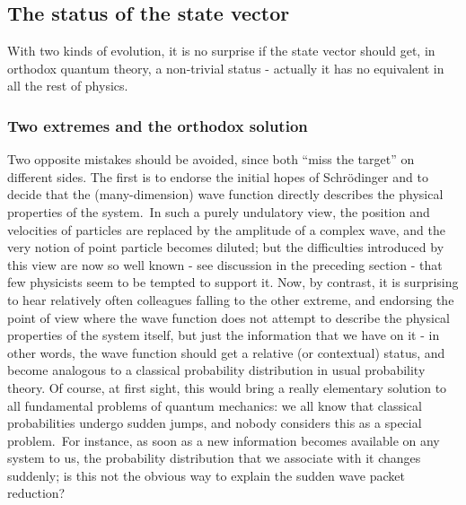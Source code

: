 \documentclass[12pt,onecolumn]{article}%
\begin{document}
\subsection{The status of the state vector}

\label{status}

With two kinds of evolution, it is no surprise if the state vector should get,
in orthodox quantum theory, a non-trivial status - actually it has no
equivalent in all the rest of physics.

\subsubsection{Two extremes and the orthodox solution}

Two opposite mistakes should be avoided, since both ``miss the target'' on
different sides. The first is to endorse the initial hopes of Schr\"{o}dinger
and to decide that the (many-dimension) wave function directly describes the
physical properties of the system.\ In such a purely undulatory view, the
position and velocities of particles are replaced by the amplitude of a
complex wave, and the very notion of point particle becomes diluted; but the
difficulties introduced by this view are now so well known - see discussion in
the preceding section - that few physicists seem to be tempted to support it.
Now, by contrast, it is surprising to hear relatively often colleagues falling
to the other extreme, and endorsing the point of view where the wave function
does not attempt to describe the physical properties of the system itself, but
just the information that we have on it - in other words, the wave function
should get a relative (or contextual) status, and become analogous to a
classical probability distribution in usual probability theory. Of course, at
first sight, this would bring a really elementary solution to all fundamental
problems of quantum mechanics: we all know that classical probabilities
undergo sudden jumps, and nobody considers this as a special problem.\ For
instance, as soon as a new information becomes available on any system to us,
the probability distribution that we associate with it changes suddenly; is
this not the obvious way to explain the sudden wave packet reduction?
\end{document}
